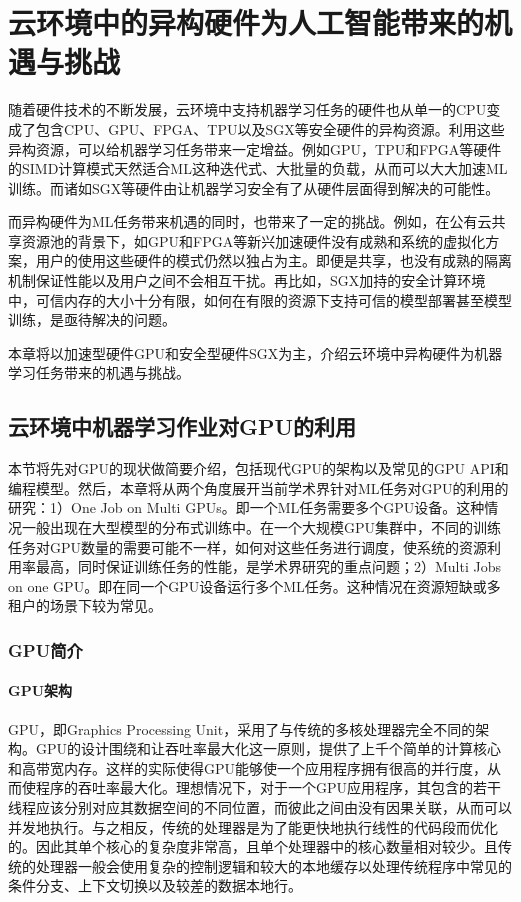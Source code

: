 
\chapter{云环境中的异构硬件为人工智能带来的机遇与挑战}
随着硬件技术的不断发展，云环境中支持机器学习任务的硬件也从单一的CPU变成了包含CPU、GPU、FPGA、TPU以及SGX等安全硬件的异构资源。利用这些异构资源，可以给机器学习任务带来一定增益。例如GPU，TPU和FPGA等硬件的SIMD计算模式天然适合ML这种迭代式、大批量的负载，从而可以大大加速ML训练。而诸如SGX等硬件由让机器学习安全有了从硬件层面得到解决的可能性。

而异构硬件为ML任务带来机遇的同时，也带来了一定的挑战。例如，在公有云共享资源池的背景下，如GPU和FPGA等新兴加速硬件没有成熟和系统的虚拟化方案，用户的使用这些硬件的模式仍然以独占为主。即便是共享，也没有成熟的隔离机制保证性能以及用户之间不会相互干扰。再比如，SGX加持的安全计算环境中，可信内存的大小十分有限，如何在有限的资源下支持可信的模型部署甚至模型训练，是亟待解决的问题。

本章将以加速型硬件GPU和安全型硬件SGX为主，介绍云环境中异构硬件为机器学习任务带来的机遇与挑战。

\section{云环境中机器学习作业对GPU的利用}

本节将先对GPU的现状做简要介绍，包括现代GPU的架构以及常见的GPU API和编程模型。然后，本章将从两个角度展开当前学术界针对ML任务对GPU的利用的研究：1）One Job on Multi GPUs。即一个ML任务需要多个GPU设备。这种情况一般出现在大型模型的分布式训练中。在一个大规模GPU集群中，不同的训练任务对GPU数量的需要可能不一样，如何对这些任务进行调度，使系统的资源利用率最高，同时保证训练任务的性能，是学术界研究的重点问题；2）Multi Jobs on one GPU。即在同一个GPU设备运行多个ML任务。这种情况在资源短缺或多租户的场景下较为常见。

\subsection{GPU简介}

\subsubsection{GPU架构}
GPU，即Graphics Processing Unit，采用了与传统的多核处理器完全不同的架构。GPU的设计围绕和让吞吐率最大化这一原则，提供了上千个简单的计算核心和高带宽内存。这样的实际使得GPU能够使一个应用程序拥有很高的并行度，从而使程序的吞吐率最大化。理想情况下，对于一个GPU应用程序，其包含的若干线程应该分别对应其数据空间的不同位置，而彼此之间由没有因果关联，从而可以并发地执行。与之相反，传统的处理器是为了能更快地执行线性的代码段而优化的。因此其单个核心的复杂度非常高，且单个处理器中的核心数量相对较少。且传统的处理器一般会使用复杂的控制逻辑和较大的本地缓存以处理传统程序中常见的条件分支、上下文切换以及较差的数据本地行。

